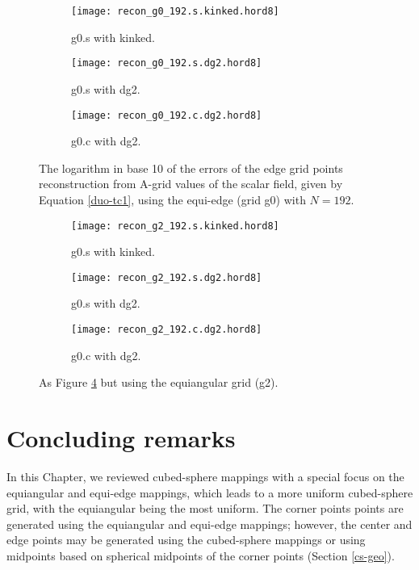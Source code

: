 \newpage
\begin{figure}[!ht]
	\centering
	\begin{subfigure}{0.9\textwidth}
		\centering
		\texttt{[image: recon\_g0\_192.s.kinked.hord8]}
		\caption{g0.s with kinked. \label{recon-errors-g0-s}}
	\end{subfigure}
	
	\begin{subfigure}{0.9\textwidth}
		\centering
		\texttt{[image: recon\_g0\_192.s.dg2.hord8]}
		\caption{g0.s with dg2.\label{recon-errors-g0-s-dg}}
	\end{subfigure}
	
	\begin{subfigure}{0.9\textwidth}
		\centering
		\texttt{[image: recon\_g0\_192.c.dg2.hord8]}
		\caption{g0.c with dg2.\label{recon-errors-g0-c-dg}}
	\end{subfigure}
	\caption{The logarithm in base 10 of the errors of the edge grid points reconstruction from A-grid values of the scalar field, 
		given by Equation \eqref{duo-tc1}, using the equi-edge (grid g0) with $N=192$. \label{recon-errors-g0}}
\end{figure}

\newpage
\begin{figure}[!ht]
	\centering
	\begin{subfigure}{0.9\textwidth}
		\centering
		\texttt{[image: recon\_g2\_192.s.kinked.hord8]}
		\caption{g0.s with kinked. \label{recon-errors-g2-s}}
	\end{subfigure}
	
	\begin{subfigure}{0.9\textwidth}
		\centering
		\texttt{[image: recon\_g2\_192.s.dg2.hord8]}
		\caption{g0.s with dg2.\label{recon-errors-g2-s-dg}}
	\end{subfigure}
	
	\begin{subfigure}{0.9\textwidth}
		\centering
		\texttt{[image: recon\_g2\_192.c.dg2.hord8]}
		\caption{g0.c with dg2.\label{recon-errors-g2-c-dg}}
	\end{subfigure}
	\caption{As Figure \ref{recon-errors-g0} but using the equiangular grid (g2). \label{recon-errors-g2}}
\end{figure}


\section{Concluding remarks}
\label{cs-conc}
In this Chapter, we reviewed cubed-sphere mappings with a special focus on the equiangular and equi-edge mappings,
which leads to a more uniform cubed-sphere grid, with the equiangular being the most uniform.
The corner points points are generated using the equiangular and equi-edge mappings;
however, the center and edge points may be generated using the cubed-sphere mappings or using midpoints based on spherical midpoints of the corner points
(Section \ref{cs-geo}).


